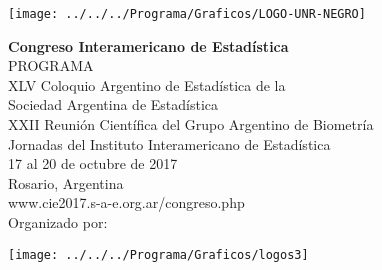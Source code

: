 \documentclass[12pt,twoside,a4paper]{article}
\newcommand{\DocYear}{2017}
\newcommand{\DocPlace}{Rosario, Argentina}
\newcommand{\DocURL}{www.cie2017.s-a-e.org.ar/congreso.php}
\begin{document}
\thispagestyle{empty}
\setcounter{page}{1}
\vspace*{5 mm}
\begin{center} \setlength{\unitlength}{1cm}
  \texttt{[image: ../../../Programa/Graficos/LOGO-UNR-NEGRO]}
\end{center}
{\center
\vspace*{6 mm}
{\LARGE \bf Congreso Interamericano de Estadística} \\ [6mm]
{\Huge PROGRAMA}  \\ [10mm]
\vspace{2 mm}
{\large XLV Coloquio Argentino de Estadística de la\\Sociedad Argentina de Estadística} \\
{\large XXII Reunión Científica del Grupo Argentino de Biometría} \\
{\large Jornadas del Instituto Interamericano de Estadística} \\
\vspace{7 mm}
{\large 17 al 20 de octubre de 2017} \\[3mm]
{\large \DocPlace} \\[6mm]
{\large \DocURL}\\[6mm]
\vfill
{\Large Organizado por:} \\ [3mm]
}
\vspace{3 mm}
\begin{center} \setlength{\unitlength}{1cm}
  \texttt{[image: ../../../Programa/Graficos/logos3]}
\end{center}


\newpage
\thispagestyle{empty}

\end{document}
